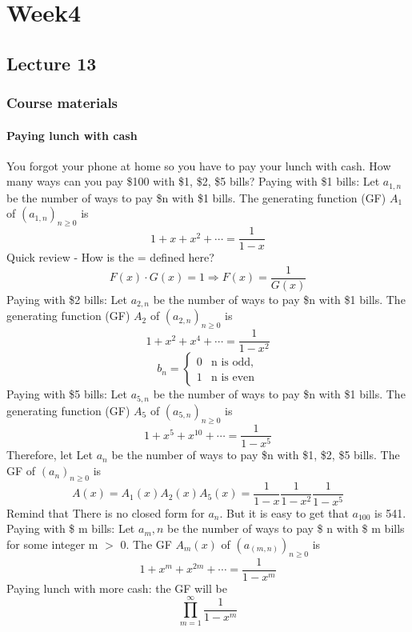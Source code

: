 \documentclass{article}
\begin{document}
\newpage \section{Week4}
\subsection{Lecture 13}
\subsubsection{Course materials}
\paragraph{Paying lunch with cash}
You forgot your phone at home so you have to pay your lunch with
cash.\newline
How many ways can you pay \$100 with \$1, \$2, \$5 bills?\newline
Paying with \$1 bills:\newline
Let $a_{1,n}$ be the number of ways to pay \$n with \$1 bills.\newline
The generating function (GF) $A_1$ of $(a_{1,n})_{n\ge 0}$ is
$$1+x+x^2+\cdots =\frac{1}{1-x}$$
Quick review - How is the = defined here?\newline
$$F(x)\cdot G(x)=1 \Longrightarrow F(x)=\frac{1}{G(x)}$$
Paying with \$2 bills:\newline
Let $a_{2,n}$ be the number of ways to pay \$n with \$1 bills.\newline
The generating function (GF) $A_2$ of $(a_{2,n})_{n\ge 0}$ is
$$1+x^2+x^4+\cdots =\frac{1}{1-x^2}$$
$$b_n=\begin{cases}
    0&\text{n is odd},\\{1}&\text{n is even}
\end{cases}$$
Paying with \$5 bills:\newline
Let $a_{5,n}$ be the number of ways to pay \$n with \$1 bills.\newline
The generating function (GF) $A_5$ of $(a_{5,n})_{n\ge 0}$ is
$$1+x^5+x^{10}+\cdots =\frac{1}{1-x^5}$$
Therefore, let Let $a_n$ be the number of ways to pay \$n with \$1, \$2, \$5 bills.\newline
The GF of $(a_n)_{n\ge 0}$ is
$$A(x)=A_1(x)A_2(x)A_5(x)=\frac{1}{1-x}\frac{1}{1-x^2}\frac{1}{1-x^5}$$
Remind that  There is no closed form for $a_n$.\newline
But it is easy to get that $a_{100}$ is 541.\newline
Paying with \$ m bills:\newline
Let $a_m,n$ be the number of ways to pay \$ n with \$ m bills for some integer m $>$ 0.\newline
The GF $A_m(x)$ of $(a_(m,n))_{n\ge 0}$ is 
$$1+x^m+x^{2m}+\cdots=\frac{1}{1-x^m}$$
Paying lunch with more cash:\newline
the GF will be $$\prod_{m=1}^{\infty}\frac{1}{1-x^m}$$
\end{document}
